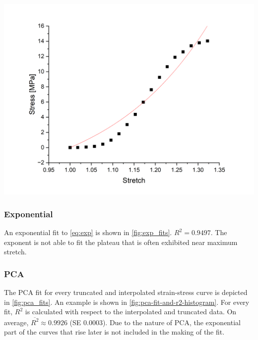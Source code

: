 \begin{marginfigure}
    \centering
    \includegraphics[width=\linewidth]{skinstression/images/exp-fits/exponential.png}
    \caption[Exponential fit]{
        Exponential fit with \cref{eq:exp} (red) for one stress-strain curve (black).
        Fit parameters were $G_0=\qty{23.8\pm4.0}{\mega\pascal\per\stretch}$, and $\lambda=\qty{4.1\pm 1.0}{\stretch}$.
        $R^2=\num{0.9497}$.
    }
    \label{fig:exp_fits}
\end{marginfigure}

\subsubsection{Exponential}
An exponential fit to \cref{eq:exp} is shown in \cref{fig:exp_fits}.
$R^2 = \num{0.9497}$.
The exponent is not able to fit the plateau that is often exhibited near maximum stretch.


\subsubsection{PCA}
The PCA fit for every truncated and interpolated strain-stress curve is depicted in \cref{fig:pca_fits}.
An example is shown in \cref{fig:pca-fit-and-r2-histogram}.
For every fit, $R^2$ is calculated with respect to the interpolated and truncated data.
On average, $\overline{R^2} \approx \num{0.9926}$ (SE \num{0.0003}).
Due to the nature of PCA, the exponential part of the curves that rise later is not included in the making of the fit.

